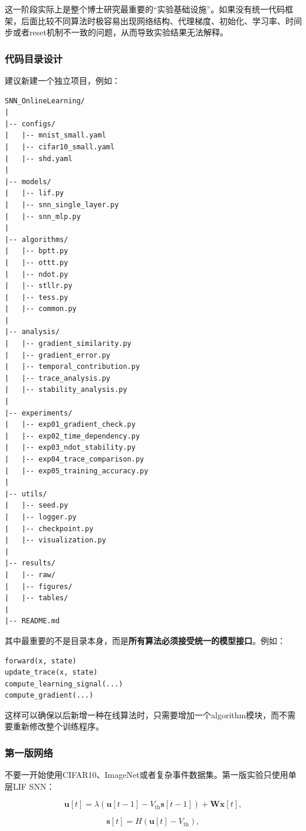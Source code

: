 \documentclass[journal,12pt,onecolumn]{IEEEtran}
\begin{document}
这一阶段实际上是整个博士研究最重要的“实验基础设施”。如果没有统一代码框架，后面比较不同算法时极容易出现网络结构、代理梯度、初始化、学习率、时间步或者reset机制不一致的问题，从而导致实验结果无法解释。

\subsubsection{代码目录设计}

建议新建一个独立项目，例如：

\begin{verbatim}
SNN_OnlineLearning/
|
|-- configs/
|   |-- mnist_small.yaml
|   |-- cifar10_small.yaml
|   |-- shd.yaml
|
|-- models/
|   |-- lif.py
|   |-- snn_single_layer.py
|   |-- snn_mlp.py
|
|-- algorithms/
|   |-- bptt.py
|   |-- ottt.py
|   |-- ndot.py
|   |-- stllr.py
|   |-- tess.py
|   |-- common.py
|
|-- analysis/
|   |-- gradient_similarity.py
|   |-- gradient_error.py
|   |-- temporal_contribution.py
|   |-- trace_analysis.py
|   |-- stability_analysis.py
|
|-- experiments/
|   |-- exp01_gradient_check.py
|   |-- exp02_time_dependency.py
|   |-- exp03_ndot_stability.py
|   |-- exp04_trace_comparison.py
|   |-- exp05_training_accuracy.py
|
|-- utils/
|   |-- seed.py
|   |-- logger.py
|   |-- checkpoint.py
|   |-- visualization.py
|
|-- results/
|   |-- raw/
|   |-- figures/
|   |-- tables/
|
|-- README.md
\end{verbatim}

其中最重要的不是目录本身，而是\textbf{所有算法必须接受统一的模型接口}。例如：

\begin{verbatim}
forward(x, state)
update_trace(x, state)
compute_learning_signal(...)
compute_gradient(...)
\end{verbatim}

这样可以确保以后新增一种在线算法时，只需要增加一个algorithm模块，而不需要重新修改整个训练程序。

\subsubsection{第一版网络}

不要一开始使用CIFAR10、ImageNet或者复杂事件数据集。第一版实验只使用单层LIF SNN：

\[
\mathbf{u}[t]
=
\lambda
\left(
\mathbf{u}[t-1]
-
V_{\mathrm{th}}\mathbf{s}[t-1]
\right)
+
\mathbf{W}\mathbf{x}[t],
\]

\[
\mathbf{s}[t]
=
H(\mathbf{u}[t]-V_{\mathrm{th}}),
\]
\end{document}
